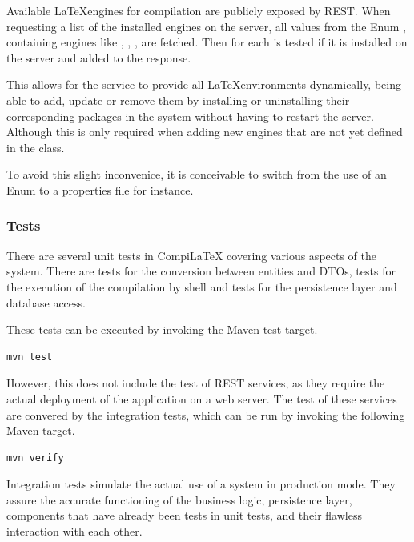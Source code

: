 
Available \LaTeX engines for compilation are publicly exposed by REST. When requesting a list of the installed engines on the server, all values from the Enum , containing engines like , , , are fetched. Then for each is tested if it is installed on the server and added to the response. 

\pagebreak

This allows for the service to provide all \LaTeX environments dynamically, being able to add, update or remove them by installing or uninstalling their corresponding packages in the system without having to restart the server. Although this is only required when adding new engines that are not yet defined in the  class. 

To avoid this slight inconvenice, it is conceivable to switch from the use of an Enum to a properties file for instance.

\subsubsection{Tests}
\label{subsubsec:compilatex-tests}

There are several unit tests in CompiLaTeX covering various aspects of the system. There are tests for the conversion between entities and DTOs, tests for the execution of the compilation by shell and tests for the persistence layer and database access.

These tests can be executed by invoking the Maven test target.

\begin{lstlisting}[caption=Invoke Unit Tests in CompiLaTex]
mvn test
\end{lstlisting}

However, this does not include the test of REST services, as they require the actual deployment of the application on a web server. The test of these services are convered by the integration tests, which can be run by invoking the following Maven target.

\begin{lstlisting}[caption=Running Integration Tests in CompiLaTex]
mvn verify
\end{lstlisting}

Integration tests simulate the actual use of a system in production mode. They assure the accurate functioning of the business logic, persistence layer, components that have already been tests in unit tests, and their flawless interaction with each other.

